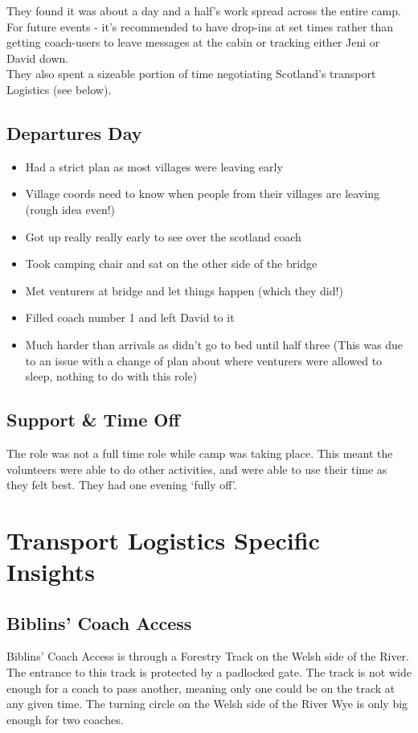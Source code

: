 They found it was about a day and a half's work spread across the entire camp. For future events - it's recommended to have drop-ins at set times rather than getting coach-users to leave messages at the cabin or tracking either Jeni or David down.\\ 

They also spent a sizeable portion of time negotiating Scotland's transport Logistics (see below).
\subsection{Departures Day}
\begin{itemize}
    \item Had a strict plan as most villages were leaving early
    \item Village coords need to know when people from their villages are leaving (rough idea even!)
    \item Got up really really early to see over the scotland coach
    \item Took camping chair and sat on the other side of the bridge
    \item Met venturers at bridge and let things happen (which they did!)
    \item Filled coach number 1 and left David to it
    \item Much harder than arrivals as didn't go to bed until half three (This was due to an issue with a change of plan about where venturers were allowed to sleep, nothing to do with this role)
\end{itemize}

\subsection{Support \& Time Off}
The role was not a full time role while camp was taking place. This meant the volunteers were able to do other activities, and were able to use their time as they felt best. They had one evening `fully off'. 

\section{Transport Logistics Specific Insights}
\subsection{Biblins' Coach Access}
Biblins' Coach Access is through a Forestry Track on the Welsh side of the River. The entrance to this track is protected by a padlocked gate. The track is not wide enough for a coach to pass another, meaning only one could be on the track at any given time. The turning circle on the Welsh side of the River Wye is only big enough for two coaches. \\


